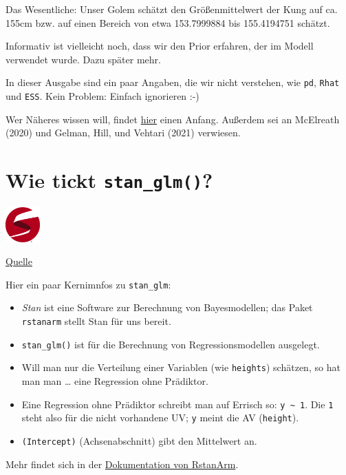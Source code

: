 \documentclass[
  a4paper,
  DIV=11]{scrreprt}
\providecommand{\tightlist}{%
  \setlength{\itemsep}{0pt}\setlength{\parskip}{0pt}}\usepackage{longtable,booktabs,array}
\theoremstyle{definition}
\theoremstyle{remark}
\begin{document}
Das Wesentliche: Unser Golem schätzt den Größenmittelwert der Kung auf
ca. 155cm bzw. auf einen Bereich von etwa 153.7999884 bis 155.4194751
schätzt.

Informativ ist vielleicht noch, dass wir den Prior erfahren, der im
Modell verwendet wurde. Dazu später mehr.

In dieser Ausgabe sind ein paar Angaben, die wir nicht verstehen, wie
\texttt{pd}, \texttt{Rhat} und \texttt{ESS}. Kein Problem: Einfach
ignorieren :-)

Wer Näheres wissen will, findet \href{}{hier} einen Anfang. Außerdem sei
an McElreath (2020) und Gelman, Hill, und Vehtari (2021) verwiesen.

\hypertarget{wie-tickt-stan_glm}{%
\section{\texorpdfstring{Wie tickt
\texttt{stan\_glm()}?}{Wie tickt stan\_glm()?}}\label{wie-tickt-stan_glm}}

\includegraphics[width=0.1\textwidth,height=\textheight]{./img/stanlogo.png}

\href{https://mc-stan.org/}{Quelle}

Hier ein paar Kernimnfos zu \texttt{stan\_glm}:

\begin{itemize}
\tightlist
\item
  \emph{Stan} ist eine Software zur Berechnung von Bayesmodellen; das
  Paket \texttt{rstanarm} stellt Stan für uns bereit.
\item
  \texttt{stan\_glm()} ist für die Berechnung von Regressionsmodellen
  ausgelegt.
\item
  Will man nur die Verteilung einer Variablen (wie \texttt{heights})
  schätzen, so hat man man \ldots{} eine Regression ohne Prädiktor.
\item
  Eine Regression ohne Prädiktor schreibt man auf Errisch so:
  \texttt{y\ \textasciitilde{}\ 1}. Die \texttt{1} steht also für die
  nicht vorhandene UV; \texttt{y} meint die AV (\texttt{height}).
\item
  \texttt{(Intercept)} (Achsenabschnitt) gibt den Mittelwert an.
\end{itemize}

Mehr findet sich in der
\href{https://mc-stan.org/rstanarm/}{Dokumentation von RstanArm}.
\end{document}
